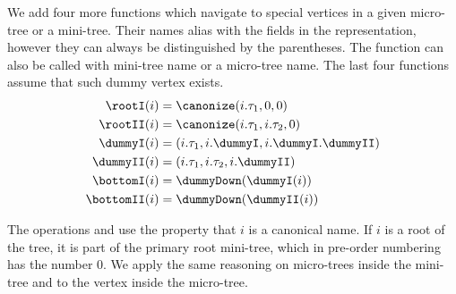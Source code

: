 \begin{algorithm}
\begin{algorithmic}
	 
		 
			\State {}
		\Else {}
			\State {}
		\EndIf
	\Else {}
		\State {}
	\EndIf
\EndFunction
\end{algorithmic}
\end{algorithm}

\begin{algorithm}
\begin{algorithmic}
	 
		\State {}
	\Else
		 
			\State {}
		\Else {}
			\State {}
		\EndIf
	\EndIf
\EndFunction
\end{algorithmic}
\end{algorithm}

We add four more functions which navigate to special vertices in a given micro-tree or a mini-tree.
Their names alias with the fields in the representation, however they can always be distinguished by the parentheses.
The function can also be called with mini-tree name or a micro-tree name.
The last four functions assume that such dummy vertex exists.
\begin{align*}
	\rootI(i) &= \canonize(i.\tau_1, 0, 0) \\
	\rootII(i) &= \canonize(i.\tau_1, i.\tau_2, 0) \\
	\dummyI(i) &= (i.\tau_1, i.\dummyI, i.\dummyI.\dummyII) \\
	\dummyII(i) &= (i.\tau_1, i.\tau_2, i.\dummyII) \\
	\bottomI(i) &= \dummyDown(\dummyI(i)) \\
	\bottomII(i) &= \dummyDown(\dummyII(i))
\end{align*}

\bigbreak

The operations \isRoot{} and \isLeaf{} use the property that $i$ is a canonical name.
If $i$ is a root of the tree, it is part of the primary root mini-tree, which in pre-order numbering has the number $0$.
We apply the same reasoning on micro-trees inside the mini-tree and to the vertex inside the micro-tree.

